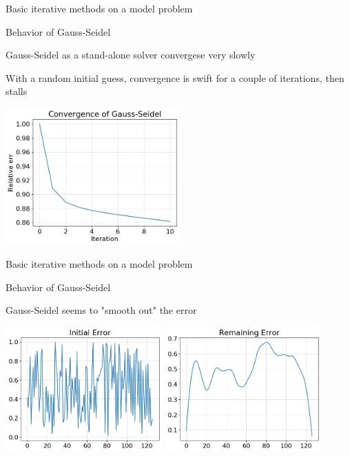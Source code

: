 \documentclass[18pt,xcolor=table]{beamer}
\begin{document}
\begin{frame}{Basic iterative methods on a model problem}
\begin{block}{Behavior of Gauss-Seidel}
\bit
\item Gauss-Seidel as a stand-alone solver convergese very slowly
\item With a random initial guess, convergence is swift for a couple of iterations, then stalls
\eit
\end{block}
\begin{center}
\includegraphics[width=0.5\textwidth]{../figures/gaussSeidelConvRand}
\end{center}
\end{frame}

\begin{frame}{Basic iterative methods on a model problem}
\begin{block}{Behavior of Gauss-Seidel}
\bit
\item Gauss-Seidel seems to "smooth out" the error
\eit
\end{block}
\begin{center}
\includegraphics[width=0.45\textwidth]{../figures/gaussSeidelInitialErrRand}
\includegraphics[width=0.45\textwidth]{../figures/gaussSeidelRemainingErrRand}
\end{center}
\end{frame}
\end{document}
